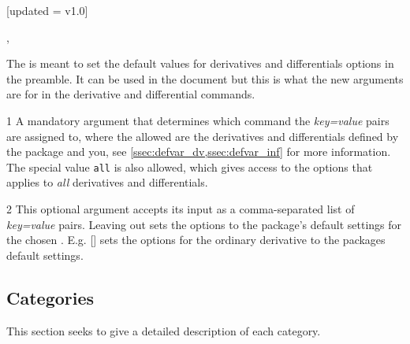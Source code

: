 	\begin{function}{\derivset}[updated = v1.0]
		\begin{syntax}
			, 
		\end{syntax}
		The  is meant to set the default values for derivatives and differentials options in the preamble. It can be used in the document but this is what the new  arguments are for in the derivative and differential commands.
		
		\begin{argument}{1}
			A mandatory argument that determines which command the \emph{key=value} pairs are assigned to, where the allowed  are the derivatives and differentials defined by the package and you, see \cref{ssec:defvar_dv,ssec:defvar_inf} for more information. The special value \texttt{all} is also allowed, which gives access to the options that applies to \textit{all} derivatives and differentials.
		\end{argument}
		
		\begin{argument}{2}
			This optional argument accepts its input as a comma-separated list of \emph{key=value} pairs. Leaving out  sets the options to the package's default settings for the chosen . E.g. \macro{\derivset}[\narg{\macro{\odv}}] sets the options for the ordinary derivative to the packages default settings.
		\end{argument}
	\end{function}
	
	\subsection{Categories}
	This section seeks to give a detailed description of each category.
	
